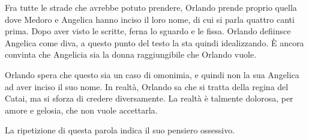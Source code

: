 \documentclass[a4paper]{article}
\begin{document}
Fra tutte le strade che avrebbe potuto prendere, Orlando prende proprio
quella dove Medoro e Angelica hanno inciso il loro nome, di cui si parla quattro canti prima.
Dopo aver visto le scritte, ferna lo sguardo e le fissa.
Orlando defiinsce Angelica come diva, a questo punto del testo la sta quindi idealizzando.
È ancora convinta che Angelicia sia la donna raggiungibile che Orlando vuole.

\begin{center} %
\begin{minipage}{0.5\textwidth}
\centering
{}
\end{minipage}
\end{center}

Orlando spera che questo sia un caso di omonimia, e quindi non la sua Angelica ad aver inciso il
suo nome.
In realtà, Orlando sa che si tratta della regina del Catai, ma si sforza di credere
diversamente. La realtà è talmente dolorosa, per amore e gelosia, che non vuole accettarla.

La ripetizione di questa parola indica il suo pensiero ossessivo.

\begin{center} %
\begin{minipage}{0.5\textwidth}
\centering
{}
\end{minipage}
\end{center}
\end{document}
